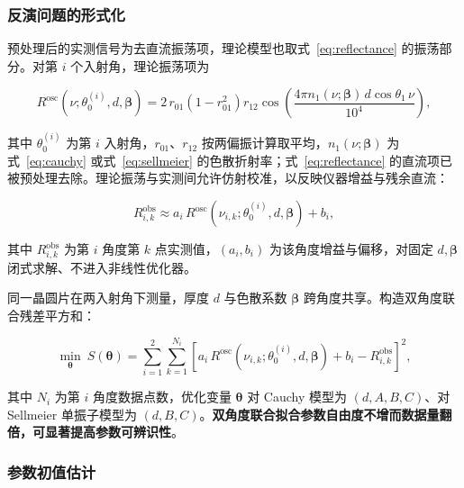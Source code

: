 \documentclass[withoutpreface,bwprint]{cumcmthesis}
\begin{document}
\subsubsection{反演问题的形式化}

预处理后的实测信号为去直流振荡项，理论模型也取式~\eqref{eq:reflectance} 的振荡部分。对第 $i$ 个入射角，理论振荡项为

\begin{equation}
R^{\mathrm{osc}}\left(\nu; \theta_0^{(i)}, d, \boldsymbol{\beta}\right)
= 2\,r_{01}\left(1-r_{01}^{2}\right)r_{12}
  \cos\left(\frac{4\pi n_1(\nu;\boldsymbol{\beta})\,d\cos\theta_1\,\nu}{10^{4}}\right),
\label{eq:theory-osc}
\end{equation}

其中 $\theta_0^{(i)}$ 为第 $i$ 入射角，$r_{01}$、$r_{12}$ 按两偏振计算取平均，$n_1(\nu;\boldsymbol{\beta})$ 为式~\eqref{eq:cauchy} 或式~\eqref{eq:sellmeier} 的色散折射率；式~\eqref{eq:reflectance} 的直流项已被预处理去除。理论振荡与实测间允许仿射校准，以反映仪器增益与残余直流：

\begin{equation}
R^{\mathrm{obs}}_{i,k} \approx a_i\, R^{\mathrm{osc}}\left(\nu_{i,k}; \theta_0^{(i)}, d, \boldsymbol{\beta}\right) + b_i,
\label{eq:linear-cal}
\end{equation}

其中 $R^{\mathrm{obs}}_{i,k}$ 为第 $i$ 角度第 $k$ 点实测值，$(a_i,b_i)$ 为该角度增益与偏移，对固定 $d,\boldsymbol{\beta}$ 闭式求解、不进入非线性优化器。

同一晶圆片在两入射角下测量，厚度 $d$ 与色散系数 $\boldsymbol{\beta}$ 跨角度共享。构造双角度联合残差平方和：

\begin{equation}
\min_{\boldsymbol{\theta}}\ S(\boldsymbol{\theta}) =
\sum_{i=1}^{2}\sum_{k=1}^{N_i}
\left[ a_i\, R^{\mathrm{osc}}\left(\nu_{i,k}; \theta_0^{(i)}, d, \boldsymbol{\beta}\right)
+ b_i - R^{\mathrm{obs}}_{i,k} \right]^{2},
\label{eq:joint-obj}
\end{equation}

其中 $N_i$ 为第 $i$ 角度数据点数，优化变量 $\boldsymbol{\theta}$ 对 Cauchy 模型为 $(d,A,B,C)$、对 Sellmeier 单振子模型为 $(d,B,C)$。\textbf{双角度联合拟合参数自由度不增而数据量翻倍，可显著提高参数可辨识性}。

\subsubsection{参数初值估计}
\end{document}
